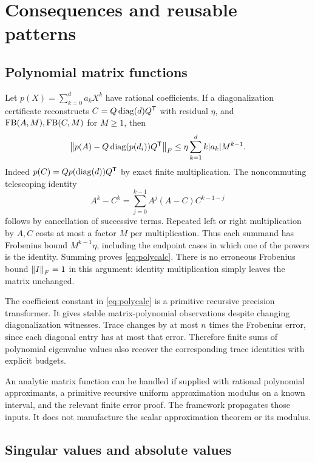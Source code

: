 \section{Consequences and reusable patterns}
\label{sec:applications}

\subsection{Polynomial matrix functions}

Let $p(X)=\sum_{k=0}^d a_kX^k$ have rational coefficients. If a diagonalization certificate reconstructs $C=Q\operatorname{diag}(d)Q^{\mathsf T}$ with residual $\eta$, and $\operatorname{FB}(A,M),\operatorname{FB}(C,M)$ for $M\ge1$, then
\begin{equation}
 \left\lVert p(A)-Q\operatorname{diag}(p(d_i))Q^{\mathsf T}\right\rVert_F
 \le\eta\sum_{k=1}^d k|a_k|M^{k-1}.
 \label{eq:polycalc}
\end{equation}
Indeed $p(C)=Qp(\operatorname{diag}(d))Q^{\mathsf T}$ by exact finite multiplication. The noncommuting telescoping identity
\[
 A^k-C^k=\sum_{j=0}^{k-1} A^j(A-C)C^{k-1-j}
\]
follows by cancellation of successive terms. Repeated left or right multiplication by $A,C$ costs at most a factor $M$ per multiplication. Thus each summand has Frobenius bound $M^{k-1}\eta$, including the endpoint cases in which one of the powers is the identity. Summing proves \eqref{eq:polycalc}. There is no erroneous Frobenius bound $\left\lVert I\right\rVert_F=1$ in this argument: identity multiplication simply leaves the matrix unchanged.

The coefficient constant in \eqref{eq:polycalc} is a primitive recursive precision transformer. It gives stable matrix-polynomial observations despite changing diagonalization witnesses. Trace changes by at most $n$ times the Frobenius error, since each diagonal entry has at most that error. Therefore finite sums of polynomial eigenvalue values also recover the corresponding trace identities with explicit budgets.

An analytic matrix function can be handled if supplied with rational polynomial approximants, a primitive recursive uniform approximation modulus on a known interval, and the relevant finite error proof. The framework propagates those inputs. It does not manufacture the scalar approximation theorem or its modulus.

\subsection{Singular values and absolute values}

